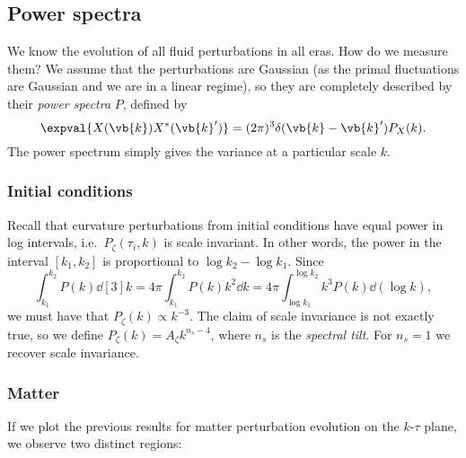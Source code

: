 \documentclass{jknotes}
\begin{document}
\subsection{Power spectra}
We know the evolution of all fluid perturbations in all eras. How do we measure them? We assume that the perturbations are Gaussian (as the primal fluctuations are Gaussian and we are in a linear regime), so they are completely described by their \emph{power spectra} \(P\), defined by
\begin{equation}
    \expval{X(\vb{k})X^*(\vb{k}')} = (2\pi)^3\delta(\vb{k}-\vb{k}')P_X(k).
\end{equation}
The power spectrum simply gives the variance at a particular scale \(k\).

\subsubsection*{Initial conditions}
Recall that curvature perturbations from initial conditions have equal power in log intervals, i.e.\ \(P_\zeta(\tau_i,k)\) is scale invariant. In other words, the power in the interval \([k_1,k_2]\) is proportional to \(\log k_2 - \log k_1\). Since
\begin{equation}
    \int^{k_2}_{k_1}P(k)\dd[3]{k} = 4\pi\int^{k_2}_{k_1} P(k) k^2\dd{k} =  4\pi\int^{\log k_2}_{\log k_1} k^3P(k)\dd{(\log k)},
\end{equation}
we must have that \(P_\zeta(k)\propto k^{-3}\). The claim of scale invariance is not exactly true, so we define \(P_\zeta(k) = A_\zeta k^{n_s-4}\), where \(n_s\) is the \emph{spectral tilt}. For \(n_s=1\) we recover scale invariance.

\subsubsection*{Matter}
If we plot the previous results for matter perturbation evolution on the \(k\)-\(\tau\) plane, we observe two distinct regions:

\begin{figure}[H]
    \centering
\end{figure}
\end{document}
